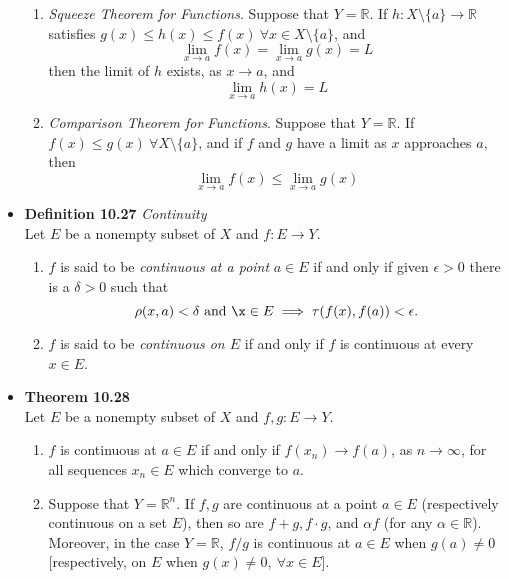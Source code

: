 \documentclass[11pt,a4paper]{article}
\begin{document}
\begin{itemize}
\begin{enumerate}
            \item \emph{Squeeze Theorem for Functions}.
                Suppose that $Y = \mathbb{R}$.
                If $h : X \setminus \{a\} \to \mathbb{R}$ satisfies
                $g(x) \leq h(x) \leq f(x) \ \forall x \in X \setminus \{a\}$, and
                \[
                    \lim_{x \to a} f(x) = \lim_{x \to a} g(x) = L
                \]
                then the limit of $h$ exists, as $x \to a$, and
                \[
                    \lim_{x \to a} h(x) = L
                \]

            \item \emph{Comparison Theorem for Functions}.
                Suppose that $Y = \mathbb{R}$.
                If $f(x) \leq g(x) \ \forall X \setminus \{a\}$, and if $f$ and $g$ have
                a limit as $x$ approaches $a$, then
                \[
                    \lim_{x \to a} f(x) \leq \lim_{x \to a} g(x)
                \]

        \end{enumerate}

    \item \textbf{Definition 10.27} \emph{Continuity} \\
        Let $E$ be a nonempty subset of $X$ and $f : E \to Y$.
        \begin{enumerate}
            \item $f$ is said to be \emph{continuous at a point} $a \in E$ if and only if
                given $\epsilon > 0$ there is a $\delta > 0$ such that
                \[
                    \rho (x, a) < \delta \ \text{and} \ \x \in E \implies
                    \tau (f(x), f(a)) < \epsilon.
                \]
            \item $f$ is said to be \emph{continuous on $E$} if and only if $f$ is
                continuous at every $x \in E$.

        \end{enumerate}

    \item \textbf{Theorem 10.28} \\
        Let $E$ be a nonempty subset of $X$ and $f, g : E \to Y$.
        \begin{enumerate}
            \item $f$ is continuous at $a \in E$ if and only if $f(x_n) \to f(a)$,
                as $n \to \infty$, for all sequences $x_n \in E$ which converge to $a$.
            \item Suppose that $Y = \mathbb{R}^n$.
                If $f, g$ are continuous at a point $a \in E$ (respectively continuous on
                a set $E$), then so are $f+g, f \cdot g$, and $\alpha f$
                (for any $\alpha \in \mathbb{R}$).
                Moreover, in the case $Y = \mathbb{R}$, $f/g$ is continuous at $a \in E$
                when $g(a) \neq 0$ [respectively, on $E$ when $g(x) \neq 0,
                \ \forall x \in E$].
        \end{enumerate}


\end{itemize}
\end{document}
